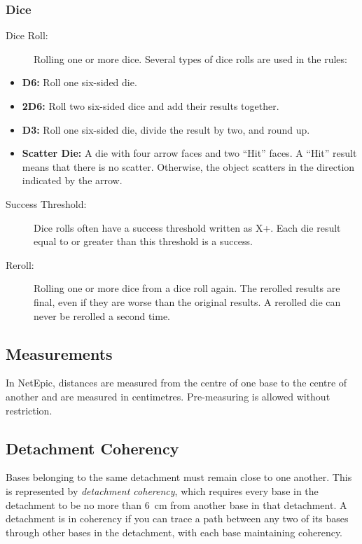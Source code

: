 \subsubsection{Dice}

\begin{description}
    \item[Dice Roll:] Rolling one or more dice. Several types of dice rolls are used in the rules:
\end{description}

\begin{itemize}
    \item \textbf{D6:} Roll one six-sided die.
    \item \textbf{2D6:} Roll two six-sided dice and add their results together.
    \item \textbf{D3:} Roll one six-sided die, divide the result by two, and round up.
    \item \textbf{Scatter Die:} A die with four arrow faces and two ``Hit'' faces. A ``Hit'' result means that there is no scatter. Otherwise, the object scatters in the direction indicated by the arrow.
\end{itemize}

\begin{description}
    \item[Success Threshold:] Dice rolls often have a success threshold written as X+. Each die result equal to or greater than this threshold is a success.

    \item[Reroll:] Rolling one or more dice from a dice roll again. The rerolled results are final, even if they are worse than the original results. A rerolled die can never be rerolled a second time.
\end{description}

\subsection{Measurements}

In NetEpic, distances are measured from the centre of one base to the centre of another and are measured in centimetres. Pre-measuring is allowed without restriction.

\subsection{Detachment Coherency}

Bases belonging to the same detachment must remain close to one another. This is represented by \textit{detachment coherency}, which requires every base in the detachment to be no more than 6~cm from another base in that detachment. A detachment is in coherency if you can trace a path between any two of its bases through other bases in the detachment, with each base maintaining coherency.


